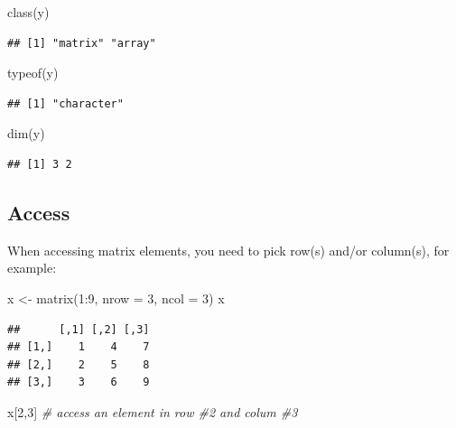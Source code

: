 \documentclass[
]{book}
\newenvironment{Shaded}{\begin{snugshade}}{\end{snugshade}}
\newcommand{\AttributeTok}[1]{\textcolor[rgb]{0.77,0.63,0.00}{#1}}
\newcommand{\CommentTok}[1]{\textcolor[rgb]{0.56,0.35,0.01}{\textit{#1}}}
\newcommand{\DecValTok}[1]{\textcolor[rgb]{0.00,0.00,0.81}{#1}}
\newcommand{\FunctionTok}[1]{\textcolor[rgb]{0.00,0.00,0.00}{#1}}
\newcommand{\NormalTok}[1]{#1}
\newcommand{\OtherTok}[1]{\textcolor[rgb]{0.56,0.35,0.01}{#1}}
\newcommand{\SpecialCharTok}[1]{\textcolor[rgb]{0.00,0.00,0.00}{#1}}
\begin{document}
\begin{Shaded}
\begin{Highlighting}[]
\FunctionTok{class}\NormalTok{(y)}
\end{Highlighting}
\end{Shaded}

\begin{verbatim}
## [1] "matrix" "array"
\end{verbatim}

\begin{Shaded}
\begin{Highlighting}[]
\FunctionTok{typeof}\NormalTok{(y)}
\end{Highlighting}
\end{Shaded}

\begin{verbatim}
## [1] "character"
\end{verbatim}

\begin{Shaded}
\begin{Highlighting}[]
\FunctionTok{dim}\NormalTok{(y)}
\end{Highlighting}
\end{Shaded}

\begin{verbatim}
## [1] 3 2
\end{verbatim}

\hypertarget{access-1}{%
\subsection{Access}\label{access-1}}

When accessing matrix elements, you need to pick row(s) and/or column(s), for example:

\begin{Shaded}
\begin{Highlighting}[]
\NormalTok{x }\OtherTok{\textless{}{-}} \FunctionTok{matrix}\NormalTok{(}\DecValTok{1}\SpecialCharTok{:}\DecValTok{9}\NormalTok{, }\AttributeTok{nrow =} \DecValTok{3}\NormalTok{, }\AttributeTok{ncol =} \DecValTok{3}\NormalTok{)}
\NormalTok{x}
\end{Highlighting}
\end{Shaded}

\begin{verbatim}
##      [,1] [,2] [,3]
## [1,]    1    4    7
## [2,]    2    5    8
## [3,]    3    6    9
\end{verbatim}

\begin{Shaded}
\begin{Highlighting}[]
\NormalTok{x[}\DecValTok{2}\NormalTok{,}\DecValTok{3}\NormalTok{] }\CommentTok{\# access an element in row \#2 and colum \#3}
\end{Highlighting}
\end{Shaded}
\end{document}
